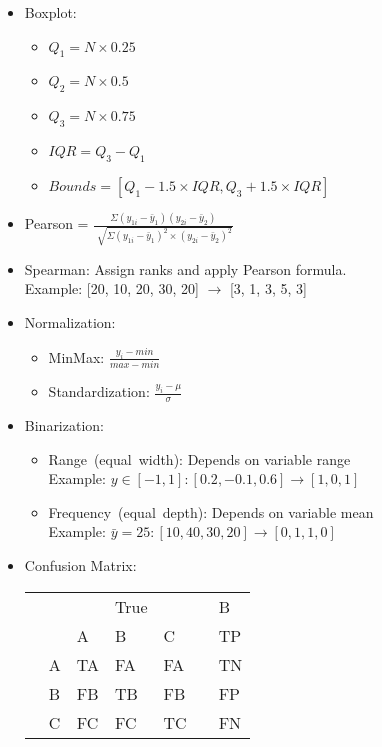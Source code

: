 \documentclass[twocolumn, 10pt]{article}
\begin{document}
\begin{itemize}[leftmargin=*, itemsep=0pt]
    
    \item Boxplot:
    \begin{itemize}[topsep=0pt]
        \item $Q_{1}=N\times0.25$
        \item $Q_{2}=N\times0.5$
        \item $Q_{3}=N\times0.75$
        \item $IQR=Q_{3}-Q_{1}$
        \item $Bounds=[Q_{1}-1.5 \times IQR, Q_{3}+1.5 \times IQR]$
    \end{itemize}

    \item Pearson = $\displaystyle \frac{\Sigma(y_{1i}-\bar{y}_{1})(y_{2i}-\bar{y}_{2})}{\sqrt[]{\Sigma(y_{1i}-\bar{y}_{1})^2\times(y_{2i}-\bar{y}_{2})^2}}$

    \item Spearman: Assign ranks and apply Pearson formula. \\
    Example: [20, 10, 20, 30, 20] $\rightarrow$ [3, 1, 3, 5, 3]

    \item Normalization:
    \begin{itemize}[topsep=0pt, itemsep=0pt]
        \item MinMax: $\displaystyle \frac{y_i-min}{max-min}$
        \item Standardization: $\displaystyle \frac{y_i-\mu}{\sigma}$
    \end{itemize}

    \item Binarization: 
    \begin{itemize}[topsep=0pt]
        \item Range\ (equal\ width): Depends on variable range \\
        Example: $y\in[-1,1]: [0.2, -0.1, 0.6] \rightarrow [1, 0, 1]$
        \item Frequency\ (equal\ depth): Depends on variable mean \\
        Example: $\bar{y}=25: [10, 40, 30, 20] \rightarrow [0, 1, 1, 0]$
    \end{itemize} 

    \item Confusion Matrix:
    \begin{tabular}{ | M{0em} M{0.5em} | M{1.5em} M{1.5em} M{1.5em} | M{0em} M{1.5em} } 
        & & & True & & & B \\
        & & A & B & C & & TP \\
         & A & TA & FA & FA & & TN \\
        & B & FB & TB & FB & & FP \\
        & C & FC & FC & TC & & FN \\
    \end{tabular}


\end{itemize}
\end{document}
